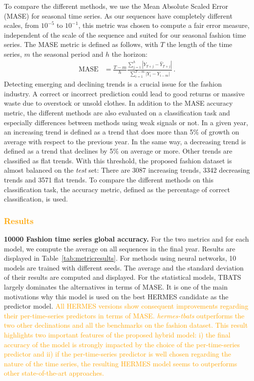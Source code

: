 \documentclass[10pt]{article} %
\begin{document}
To compare the different methods, we use the Mean Absolute Scaled Error (MASE) for seasonal time series. As our sequences have completely different scales, from $10^{-5}$ to $10^{-1}$, this metric was chosen to compute a fair error measure, independent of the scale of the sequence and suited for our seasonal fashion time series. The MASE metric is defined as follows, with $T$ the length of the time series, $m$ the seasonal period and $h$ the horizon:
\begin{align*}
\mathrm{MASE} &= \frac{T-m}{h}\frac{\sum_{j=1}^h |Y_{T+j} - \hat{Y}_{T+j}| }{\sum_{i=1}^{T-m} |Y_i - Y_{i-m}|}\,.
\end{align*}
Detecting emerging and declining trends is a crucial issue for the fashion industry. A correct or incorrect prediction could lead to good returns or massive waste due to overstock or unsold clothes. In addition to the MASE accuracy metric, the different methods are also evaluated on a classification task and especially differences between methods using weak signals or not. In a given year, an increasing trend is defined as a trend that does more than 5\% of growth on average with respect to the previous year. In the same way, a decreasing trend is defined as a trend that declines by 5\% on average or more. Other trends are classified as flat trends. With this threshold, the proposed fashion dataset is almost balanced on the {\em test} set: There are 3087 increasing trends, 3342 decreasing trends and 3571 flat trends. To compare the different methods on this classification task, the accuracy metric, defined as the percentage of correct classification, is used.


\textcolor{orange}{\subsubsection{Results}}

\textbf{10000 Fashion time series global accuracy. }For the two metrics and for each model, we compute the average on all sequences in the final year. Results are displayed in Table~\ref{tab:metricresults}. For methods using neural networks, 10 models are trained  with different seeds. The average and the standard deviation of their results are computed and displayed. For the statistical models, TBATS largely dominates the alternatives in terms of MASE. It is one of the main motivations why this model is used on the best HERMES candidate as the predictor model. \textcolor{orange}{All HERMES versions show consequent improvements regarding their per-time-series predictors in terms of MASE. \textit{hermes-tbats} outperforms the two other declinations and all the benchmarks on the fashion dataset. This result highlights two important features of the proposed hybrid model: i) the final accuracy of the model is strongly impacted by the choice of the per-time-series predictor and ii) if the per-time-series predictor is well chosen regarding the nature of the time series, the resulting HERMES model seems to outperforms other state-of-the-art approaches.}
\end{document}
